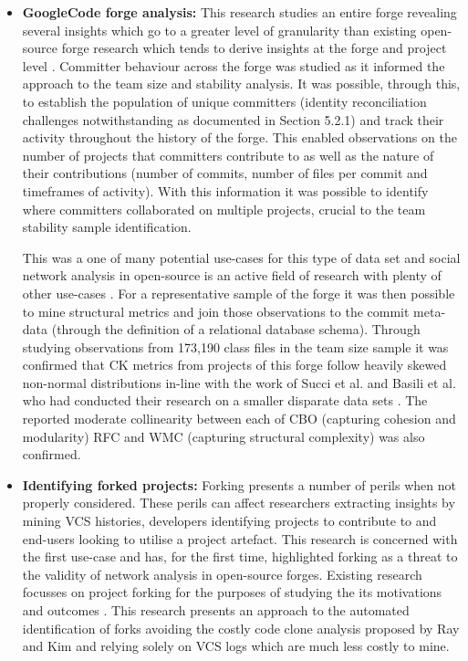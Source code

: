 \begin{itemize}
\item  \textbf{GoogleCode forge  analysis: } This research studies an entire forge revealing several insights which go to a greater level of granularity than existing open-source forge research which tends to derive insights at the forge and project level \citep{howison2009flossmole, iqbal2012integrating, squire2017lives}. Committer behaviour across the forge was studied as it informed the approach to the team size and stability analysis. It was possible, through this, to establish the population of unique committers (identity reconciliation challenges notwithstanding as documented in Section 5.2.1) and track their activity throughout the history of the forge. This enabled observations on the number of projects that committers contribute to as well as the nature of their contributions (number of commits, number of files per commit and timeframes of activity). With this information it was possible to identify where committers collaborated on multiple projects, crucial to the team stability sample identification. 

This was a one of many potential use-cases for this type of data set and social network analysis in open-source is an active field of research with plenty of other use-cases \citep{hassan2008road, hemmati2013msr}. For a representative sample of the forge it was then possible to mine structural metrics and join those observations to the commit meta-data (through the definition of a relational database schema). Through studying observations from 173,190 class files in the team size sample it was confirmed that CK metrics from projects of this forge follow heavily skewed non-normal distributions in-line with the work of Succi et al. and Basili et al. who had conducted their research on a smaller disparate data sets \citep{basili1996validation, succi2005empirical}. The reported moderate collinearity between each of CBO (capturing cohesion and modularity) RFC and WMC (capturing structural complexity) was also confirmed.

\item  \textbf{Identifying forked projects: } Forking presents a number of perils when not properly considered. These perils can affect researchers extracting insights by mining VCS histories, developers identifying projects to contribute to and end-users looking to utilise a project artefact. This research is concerned with the first use-case and has, for the first time, highlighted forking as a threat to the validity of network analysis in open-source forges. Existing research focusses on project forking for the purposes of studying the its motivations and outcomes \citep{robles2006mining, nyman2011fork}. This research presents an approach to the automated identification of forks avoiding the costly code clone analysis proposed by Ray and Kim \citep{ray2012repertoire} and relying solely on VCS logs which are much less costly to mine.


\end{itemize}
